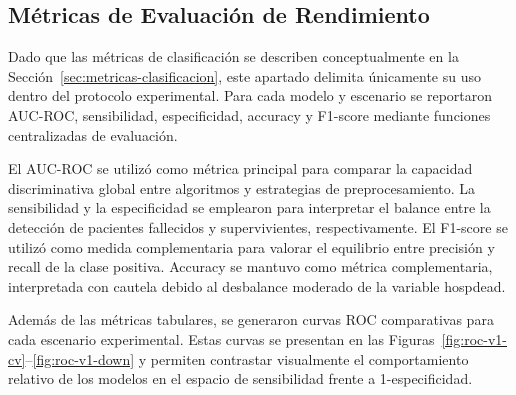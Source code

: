 \subsection{Métricas de Evaluación de Rendimiento}

Dado que las métricas de clasificación se describen conceptualmente en la
Sección~\ref{sec:metricas-clasificacion}, este apartado delimita únicamente su
uso dentro del protocolo experimental. Para cada modelo y escenario se
reportaron AUC-ROC, sensibilidad, especificidad, accuracy y F1-score mediante
funciones centralizadas de evaluación.

El AUC-ROC se utilizó como métrica principal para comparar la capacidad
discriminativa global entre algoritmos y estrategias de preprocesamiento. La
sensibilidad y la especificidad se emplearon para interpretar el balance entre
la detección de pacientes fallecidos y supervivientes, respectivamente. El
F1-score se utilizó como medida complementaria para valorar el equilibrio entre
precisión y recall de la clase positiva. Accuracy se mantuvo como métrica
complementaria, interpretada con cautela debido al desbalance moderado de la
variable hospdead.

Además de las métricas tabulares, se generaron curvas ROC comparativas para cada
escenario experimental. Estas curvas se presentan en las
Figuras~\ref{fig:roc-v1-cv}--\ref{fig:roc-v1-down} y permiten contrastar
visualmente el comportamiento relativo de los modelos en el espacio de
sensibilidad frente a 1-especificidad.
